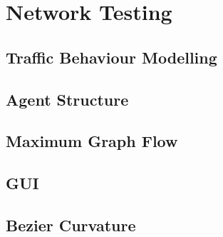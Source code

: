 \section{Network Testing}

    \subsection{Traffic Behaviour Modelling}

    \subsection{Agent Structure}

    \subsection{Maximum Graph Flow}

    \subsection{GUI}

    \subsection{Bezier Curvature}
